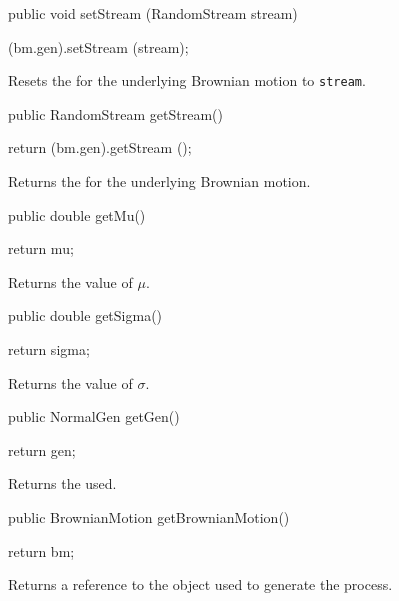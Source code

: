 \begin{code}

   public void setStream (RandomStream stream) \begin{hide} { (bm.gen).setStream (stream); }\end{hide}
\end{code}
\begin{tabb}
Resets the 
for the underlying Brownian motion to \texttt{stream}.
\end{tabb}
\begin{code}

   public RandomStream getStream() \begin{hide} { return (bm.gen).getStream (); }\end{hide}
\end{code}
\begin{tabb}
Returns the 
for the underlying Brownian motion.
\end{tabb}
\begin{code}

   public double getMu() \begin{hide} { return mu; }\end{hide}
\end{code}
\begin{tabb} Returns the value of $\mu$.
\end{tabb}
\begin{code}

   public double getSigma() \begin{hide} { return sigma; }\end{hide}
\end{code}
\begin{tabb} Returns the value of $\sigma$.
\end{tabb}
\begin{code}

   public NormalGen getGen() \begin{hide} { return gen; }\end{hide}
\end{code}
\begin{tabb}
Returns the  used.
\end{tabb}
\begin{code}

   public BrownianMotion getBrownianMotion() \begin{hide} {
        return bm;
    }\end{hide}
\end{code}
\begin{tabb} Returns a reference to the  object
used to generate the process.
\end{tabb}

\begin{code} \begin{hide}

    protected void init() {
        super.init();   // Maybe useless...
    }

}
\end{hide}\end{code}
